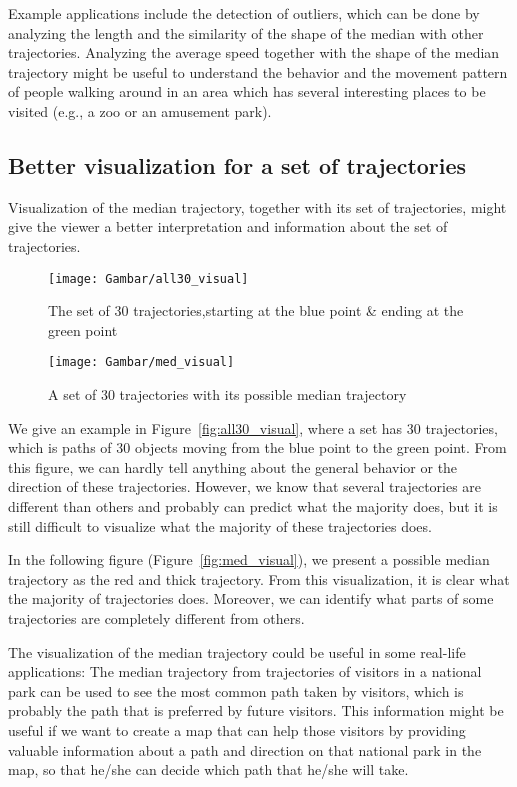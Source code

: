Example applications include the detection of outliers, which can be done by analyzing the length and the similarity of the shape of the median with other trajectories.
Analyzing the average speed together with the shape of the median trajectory might be useful to understand the behavior and the movement pattern of people walking around in an area which has several interesting places to be visited (e.g., a zoo or an amusement park). 

\subsection{Better visualization for a set of trajectories}
Visualization of the median trajectory, together with its set of trajectories, might give the viewer a better interpretation and information about the set of trajectories.

\begin{figure}
\centering
\texttt{[image: Gambar/all30\_visual]}
\caption[The set of 30 trajectories, starting at the blue point \& ending at the green point]{The set of 30 trajectories,starting at the blue point \& ending at the green point} 
\end{figure}

\begin{figure}
\centering
\texttt{[image: Gambar/med\_visual]}
\caption[A set of 30 trajectories with its possible median trajectory]{A set of 30 trajectories with its possible median trajectory} 
\end{figure}

We give an example in Figure~\ref{fig:all30_visual}, where a set has 30 trajectories, which is paths of 30 objects moving from the blue point to the green point.
From this figure, we can hardly tell anything about the general behavior or the direction of these trajectories. 
However, we know that several trajectories are different than others and probably can predict what the majority does, but it is still difficult to visualize what the majority of these trajectories does.

In the following figure (Figure~\ref{fig:med_visual}), we present a possible median trajectory as the red and thick trajectory.
From this visualization, it is clear what the majority of trajectories does.
Moreover, we can identify what parts of some trajectories are completely different from others. 

The visualization of the median trajectory could be useful in some real-life applications:
The median trajectory from trajectories of visitors in a national park can be used to see the most common path taken by visitors, which is probably the path that is preferred by future visitors.
This information might be useful if we want to create a map that can help those visitors by providing valuable information about a path and direction on that national park in the map, so that he/she can decide which path that he/she will take. 

